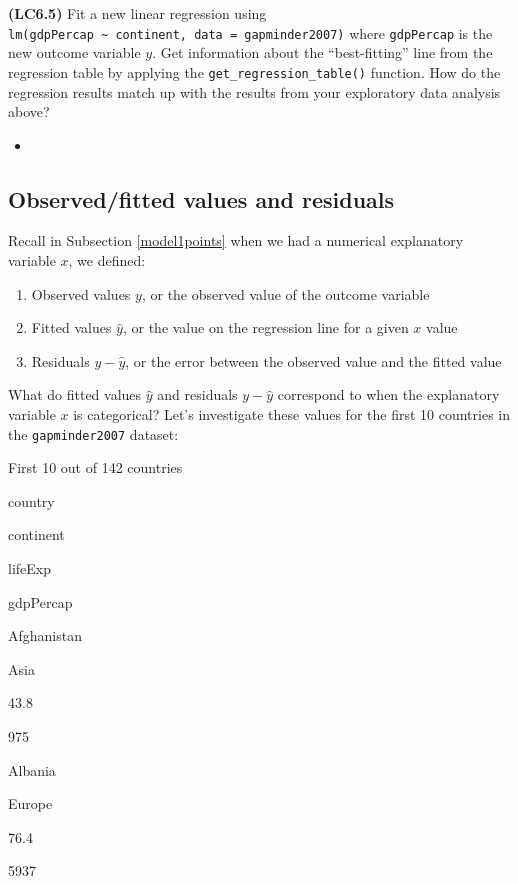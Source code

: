 \documentclass[12pt,]{krantz}
\providecommand{\tightlist}{%
  \setlength{\itemsep}{0pt}\setlength{\parskip}{0pt}}
\newenvironment{rmdblock}[1]
  {\begin{shaded*}
  \begin{itemize}
  \renewcommand{\labelitemi}{
    \raisebox{-.7\height}[0pt][0pt]{
    }
  }
  \item
  }
  {
  \end{itemize}
  \end{shaded*}
  }
\newenvironment{learncheck}
  {\begin{rmdblock}{warning}}
  {\end{rmdblock}}
\begin{document}
\textbf{(LC6.5)} Fit a new linear regression using
\texttt{lm(gdpPercap\ \textasciitilde{}\ continent,\ data\ =\ gapminder2007)}
where \texttt{gdpPercap} is the new outcome variable \(y\). Get
information about the ``best-fitting'' line from the regression table by
applying the \texttt{get\_regression\_table()} function. How do the
regression results match up with the results from your exploratory data
analysis above?

\begin{learncheck}

\end{learncheck}

\subsection{Observed/fitted values and residuals}\label{model2points}

Recall in Subsection \ref{model1points} when we had a numerical
explanatory variable \(x\), we defined:

\begin{enumerate}
\def\labelenumi{\arabic{enumi}.}
\tightlist
\item
  Observed values \(y\), or the observed value of the outcome variable
\item
  Fitted values \(\widehat{y}\), or the value on the regression line for
  a given \(x\) value
\item
  Residuals \(y - \widehat{y}\), or the error between the observed value
  and the fitted value
\end{enumerate}

What do fitted values \(\widehat{y}\) and residuals \(y - \widehat{y}\)
correspond to when the explanatory variable \(x\) is categorical? Let's
investigate these values for the first 10 countries in the
\texttt{gapminder2007} dataset:

\label{tab:unnamed-chunk-201}First 10 out of 142 countries

country

continent

lifeExp

gdpPercap

Afghanistan

Asia

43.8

975

Albania

Europe

76.4

5937
\end{document}
